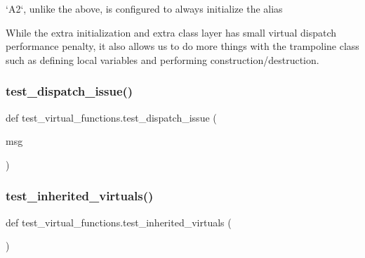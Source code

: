 \begin{DoxyVerb}`A2`, unlike the above, is configured to always initialize the alias

While the extra initialization and extra class layer has small virtual dispatch
performance penalty, it also allows us to do more things with the trampoline
class such as defining local variables and performing construction/destruction.
\end{DoxyVerb}
 \mbox{\label{namespacetest__virtual__functions_aebcdfe688eeefd3b788681e3cb9a69a2}} 
\subsubsection{\texorpdfstring{test\_dispatch\_issue()}{test\_dispatch\_issue()}}
{\footnotesize\ttfamily def test\+\_\+virtual\+\_\+functions.\+test\+\_\+dispatch\+\_\+issue (\begin{DoxyParamCaption}\item[{}]{msg }\end{DoxyParamCaption})}

 \mbox{\label{namespacetest__virtual__functions_a6659077ad0a4b585ae2980928dfebcd5}} 
\subsubsection{\texorpdfstring{test\_inherited\_virtuals()}{test\_inherited\_virtuals()}}
{\footnotesize\ttfamily def test\+\_\+virtual\+\_\+functions.\+test\+\_\+inherited\+\_\+virtuals (\begin{DoxyParamCaption}{ }\end{DoxyParamCaption})}

\mbox{\label{namespacetest__virtual__functions_a8c8dcdf2a75a72c51c420893d6a37e45}} 
